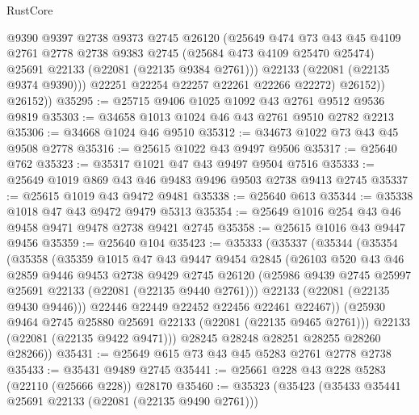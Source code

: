\begin{lexlean}{RustCore}
\begin{coremodule}
                @9390
                @9397
                @2738
                @9373
                @2745
                @26120
                (@25649
                  @474
                  @73
                  @43
                  @45
                  @4109
                  @2761
                  @2778
                  @2738
                  @9383
                  @2745
                  (@25684 @473 @4109 @25470 @25474)
                  @25691
                  @22133
                  (@22081 (@22135 @9384 @2761)))
                @22133
                (@22081 (@22135 @9374 @9390)))
              @22251
              @22254
              @22257
              @22261
              @22266
              @22272)
            @26152))
        @26152))
@35295 := @25715 @9406 @1025 @1092 @43 @2761 @9512 @9536 @9819
@35303 := @34658 @1013 @1024 @46 @43 @2761 @9510 @2782 @2213
@35306 := @34668 @1024 @46 @9510
@35312 := @34673 @1022 @73 @43 @45 @9508 @2778
@35316 := @25615 @1022 @43 @9497 @9506
@35317 := @25640 @762
@35323 := @35317 @1021 @47 @43 @9497 @9504 @7516
@35333 := @25649 @1019 @869 @43 @46 @9483 @9496 @9503 @2738 @9413 @2745
@35337 := @25615 @1019 @43 @9472 @9481
@35338 := @25640 @613
@35344 := @35338 @1018 @47 @43 @9472 @9479 @5313
@35354 := @25649 @1016 @254 @43 @46 @9458 @9471 @9478 @2738 @9421 @2745
@35358 := @25615 @1016 @43 @9447 @9456
@35359 := @25640 @104
@35423 := @35333
    (@35337
      (@35344
        (@35354
          (@35358
            (@35359
              @1015
              @47
              @43
              @9447
              @9454
              @2845
              (@26103
                @520
                @43
                @46
                @2859
                @9446
                @9453
                @2738
                @9429
                @2745
                @26120
                (@25986 @9439 @2745 @25997 @25691 @22133 (@22081 (@22135 @9440 @2761)))
                @22133
                (@22081 (@22135 @9430 @9446)))
              @22446
              @22449
              @22452
              @22456
              @22461
              @22467))
          (@25930 @9464 @2745 @25880 @25691 @22133 (@22081 (@22135 @9465 @2761)))
          @22133
          (@22081 (@22135 @9422 @9471)))
        @28245
        @28248
        @28251
        @28255
        @28260
        @28266))
@35431 := @25649 @615 @73 @43 @45 @5283 @2761 @2778 @2738
@35433 := @35431 @9489 @2745
@35441 := @25661 @228 @43 @228 @5283 (@22110 (@25666 @228)) @28170
@35460 := @35323
    (@35423
      (@35433 @35441 @25691 @22133 (@22081 (@22135 @9490 @2761)))

\end{coremodule}
\end{lexlean}
